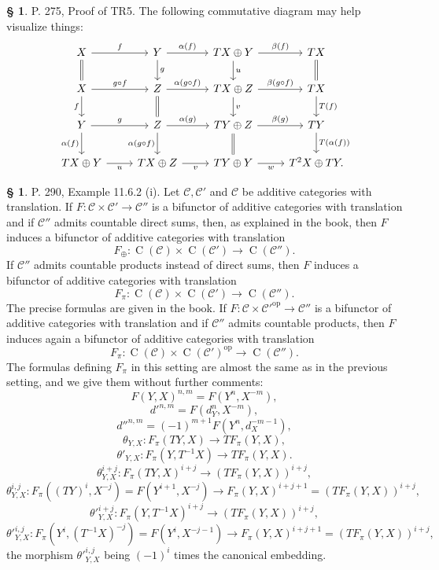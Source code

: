 \documentclass[12pt]{article}%
\theoremstyle{remark}
\theoremstyle{definition}
\newtheorem{s}[thm]{\S}%
\newcommand{\C}{\mathcal C}
\DeclareMathOperator{\op}{op}
\begin{document}
\begin{s}
P. 275, Proof of TR5. The following commutative diagram may help visualize things: 
$$
\begin{tikzcd}
X\ar{r}{f}\ar[equal]{d}&Y\ar{r}{\alpha(f)}\ar{d}{g}&TX\oplus Y\ar{r}{\beta(f)}\ar{d}{u}&TX\ar[equal]{d}\\ 
X\ar{r}{g\circ f}\ar{d}[swap]{f}&Z\ar{r}{\alpha(g\circ f)}\ar[equal]{d}&TX\oplus Z\ar{r}{\beta(g\circ f)}\ar{d}{v}&TX\ar{d}{T(f)}\\ 
Y\ar{r}{g}\ar{d}[swap]{\alpha(f)}&Z\ar{r}{\alpha(g)}\ar{d}[swap]{\alpha(g\circ f)}&TY\oplus Z\ar{r}{\beta(g)}\ar[equal]{d}&TY\ar{d}{T(\alpha(f))}\\ 
TX\oplus Y\ar{r}[swap]{u}&TX\oplus Z\ar{r}[swap]{v}&TY\oplus Y\ar{r}[swap]{w}&T^2X\oplus TY.
\end{tikzcd}
$$ 
\end{s}

\begin{s}
P. 290, Example 11.6.2 (i). Let $\C,\C'$ and $\C$ be additive categories with translation. If $F:\C\times\C'\to\C''$ is a bifunctor of additive categories with translation and if $\C''$ admits countable direct sums, then, as explained in the book, then $F$ induces a bifunctor of additive categories with translation 
$$
F_\oplus:\operatorname{C}(\C)\times\operatorname{C}(\C')\to\operatorname{C}(\C'').
$$ 
If $\C''$ admits countable products instead of direct sums, then $F$ induces a bifunctor of additive categories with translation 
$$
F_\pi:\operatorname{C}(\C)\times\operatorname{C}(\C')\to\operatorname{C}(\C'').
$$ 
The precise formulas are given in the book. If $F:\C\times\C'^\op\to\C''$ is a bifunctor of additive categories with translation and if $\C''$ admits countable products, then $F$ induces again a bifunctor of additive categories with translation 
$$
F_\pi:\operatorname{C}(\C)\times\operatorname{C}(\C')^{\op}\to\operatorname{C}(\C'').
$$ 
The formulas defining $F_\pi$ in this setting are almost the same as in the previous setting, and we give them without further comments:
$$
F(Y,X)^{n,m}=F(Y^n,X^{-m}),
$$
$$
d'^{n,m}=F(d_Y^n,X^{-m}),
$$
$$
d''^{n,m}=(-1)^{m+1}F(Y^n,d_X^{-m-1}),
$$
$$
\theta_{Y,X}:F_\pi(TY,X)\to TF_\pi(Y,X),
$$
$$
\theta'_{Y,X}:F_\pi(Y,T^{-1}X)\to TF_\pi(Y,X).
$$
$$
\theta_{Y,X}^{i+j}:F_\pi(TY,X)^{i+j}\to(TF_\pi(Y,X))^{i+j},
$$
$$
\theta_{Y,X}^{i,j}:F_\pi((TY)^i,X^{-j})=F(Y^{i+1},X^{-j})\to F_\pi(Y,X)^{i+j+1}=(TF_\pi(Y,X))^{i+j},
$$
$$
{\theta'}_{Y,X}^{i+j}:F_\pi(Y,T^{-1}X)^{i+j}\to(TF_\pi(Y,X))^{i+j},
$$
$$
{\theta'}_{Y,X}^{i,j}:F_\pi(Y^i,(T^{-1}X)^{-j})=F(Y^i,X^{-j-1})\to F_\pi(Y,X)^{i+j+1}=(TF_\pi(Y,X))^{i+j},
$$
the morphism ${\theta'}_{Y,X}^{i,j}$ being $(-1)^i$ times the canonical embedding.
\end{s}
\end{document}
